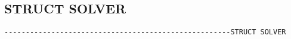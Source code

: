 
\subsection{STRUCT SOLVER}
\begin{verbatim}
-----------------------------------------------------STRUCT SOLVER
\end{verbatim}

